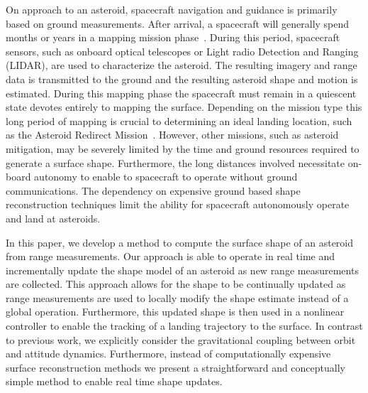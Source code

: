 \documentclass[letterpaper, paper,11pt]{AAS}		%
\begin{document}
On approach to an asteroid, spacecraft navigation and guidance is primarily based on ground measurements.
After arrival, a spacecraft will generally spend months or years in a mapping mission phase~\cite{kubota2003,cole1998}.
During this period, spacecraft sensors, such as onboard optical telescopes or Light radio Detection and Ranging (LIDAR), are used to characterize the asteroid.
The resulting imagery and range data is transmitted to the ground and the resulting asteroid shape and motion is estimated. 
During this mapping phase the spacecraft must remain in a quiescent state devotes entirely to mapping the surface.
Depending on the mission type this long period of mapping is crucial to determining an ideal landing location, such as the Asteroid Redirect Mission~\cite{gates2015}. 
However, other missions, such as asteroid mitigation, may be severely limited by the time and ground resources required to generate a surface shape.
Furthermore, the long distances involved necessitate on-board autonomy to enable to spacecraft to operate without ground communications.
The dependency on expensive ground based shape reconstruction techniques limit the ability for spacecraft autonomously operate and land at asteroids.

In this paper, we develop a method to compute the surface shape of an asteroid from range measurements.
Our approach is able to operate in real time and incrementally update the shape model of an asteroid as new range measurements are collected.
This approach allows for the shape to be continually updated as range measurements are used to locally modify the shape estimate instead of a global operation.
Furthermore, this updated shape is then used in a nonlinear controller to enable the tracking of a landing trajectory to the surface.
In contrast to previous work, we explicitly consider the gravitational coupling between orbit and attitude dynamics.
Furthermore, instead of computationally expensive surface reconstruction methods we present a straightforward and conceptually simple method to enable real time shape updates. 


\end{document}
